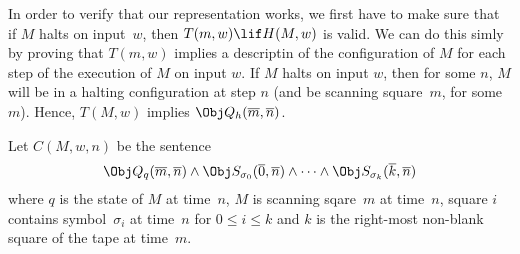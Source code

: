 \documentclass[../../include/open-logic-section]{subfiles}
\begin{document}

\begin{explain}
In order to verify that our representation works, we first have to
make sure that if $M$ halts on input~$w$, then $T(m, w) \lif H(M, w)$
is valid.  We can do this simly by proving that $T(m, w)$ implies a
descriptin of the configuration of $M$ for each step of the execution
of $M$ on input $w$.  If $M$ halts on input $w$, then for some $n$,
$M$ will be in a halting configuration at step $n$ (and be scanning
square~$m$, for some $m$).  Hence, $T(M, w)$ implies $\Obj
Q_h(\overline m, \overline n)$.
\end{explain}

\begin{defn}
Let $C(M, w, n)$ be the sentence
\[
\Obj Q_q(\overline m, \overline n) \land \Obj S_{\sigma_0}(\overline
0, \overline n) \land \dots \land \Obj S_{\sigma_k}(\overline k,
\overline n)
\]
where $q$ is the state of $M$ at time~$n$, $M$ is scanning sqare~$m$
at time~$n$, square $i$ contains symbol~$\sigma_i$ at time~$n$ for $0
\le i \le k$ and $k$ is the right-most non-blank square of the tape at
time~$m$.
\end{defn}
\end{document}

